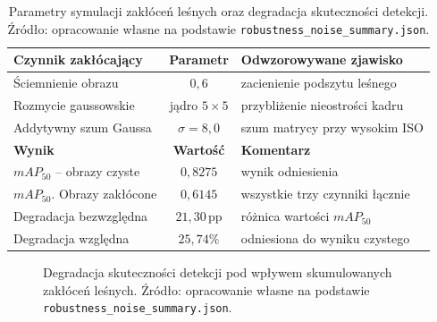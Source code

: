 \begin{table}[htbp]
 \centering
 \caption{Parametry symulacji zakłóceń leśnych oraz degradacja skuteczności detekcji. Źródło: opracowanie własne na podstawie \texttt{robustness\_noise\_summary.json}.}
 \label{tab:odpornosc}
 \begin{tabular}{|p{5.0cm}|c|p{5.0cm}|}
 \hline
 \textbf{Czynnik zakłócający} & \textbf{Parametr} & \textbf{Odwzorowywane zjawisko} \\
 \hline \hline
 Ściemnienie obrazu & $0{,}6$ & zacienienie podszytu leśnego \\
 \hline
 Rozmycie gaussowskie & jądro $5\times5$ & przybliżenie nieostrości kadru \\
 \hline
 Addytywny szum Gaussa & $\sigma=8{,}0$ & szum matrycy przy wysokim ISO \\
 \hline \hline
 \textbf{Wynik} & \textbf{Wartość} & \textbf{Komentarz} \\
 \hline \hline
 $mAP_{50}$ – obrazy czyste & $0{,}8275$ & wynik odniesienia \\
 \hline
 $mAP_{50}$. Obrazy zakłócone & $0{,}6145$ & wszystkie trzy czynniki łącznie \\
 \hline
 Degradacja bezwzględna & $21{,}30$\,pp & różnica wartości $mAP_{50}$ \\
 \hline
 Degradacja względna & $25{,}74\%$ & odniesiona do wyniku czystego \\
 \hline
 \end{tabular}
\end{table}

\begin{figure}[htbp]
 \centering
 \caption{Degradacja skuteczności detekcji pod wpływem skumulowanych zakłóceń leśnych. Źródło: opracowanie własne na podstawie \texttt{robustness\_noise\_summary.json}.}
 \label{fig:odpornosc_wykres}
\end{figure}

